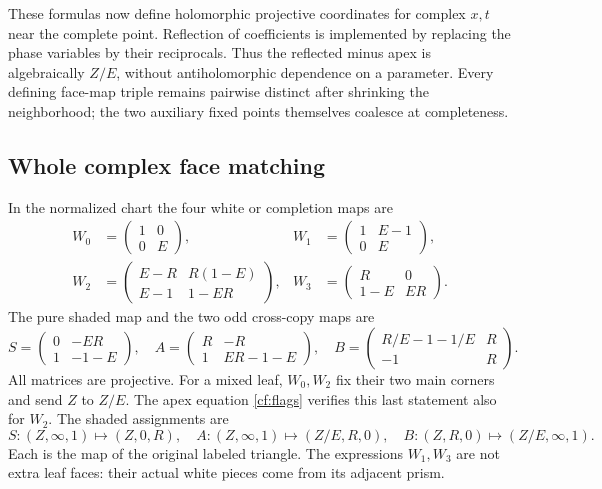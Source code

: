 These formulas now define holomorphic projective coordinates
for complex $x,t$ near the complete point.
Reflection of coefficients is implemented by replacing the
phase variables by their reciprocals. Thus the reflected
minus apex is algebraically $Z/E$, without antiholomorphic
dependence on a parameter. Every defining face-map triple remains
pairwise distinct after shrinking the neighborhood; the two
auxiliary fixed points themselves coalesce at completeness.

\subsection{Whole complex face matching}
In the normalized chart the four white or completion maps are
\begin{equation}\label{cf:white}
\begin{aligned}
 W_0&=\begin{pmatrix}1&0\\0&E\end{pmatrix},&
 W_1&=\begin{pmatrix}1&E-1\\0&E\end{pmatrix},\\
 W_2&=\begin{pmatrix}E-R&R(1-E)\\E-1&1-ER\end{pmatrix},&
 W_3&=\begin{pmatrix}R&0\\1-E&ER\end{pmatrix}.
\end{aligned}
\end{equation}
The pure shaded map and the two odd cross-copy maps are
\begin{equation}\label{cf:shaded}
 S=\begin{pmatrix}0&-ER\\1&-1-E\end{pmatrix},\quad
 A=\begin{pmatrix}R&-R\\1&ER-1-E\end{pmatrix},\quad
 B=\begin{pmatrix}R/E-1-1/E&R\\-1&R\end{pmatrix}.
\end{equation}
All matrices are projective. For a mixed leaf, $W_0,W_2$
fix their two main corners and send $Z$ to $Z/E$.
The apex equation \eqref{cf:flags} verifies this last statement
also for $W_2$. The shaded assignments are
\[
 S:(Z,\infty,1)\mapsto(Z,0,R),\quad
 A:(Z,\infty,1)\mapsto(Z/E,R,0),\quad
 B:(Z,R,0)\mapsto(Z/E,\infty,1).
\]
Each is the map of the original labeled triangle.
The expressions $W_1,W_3$ are not extra leaf faces:
their actual white pieces come from its adjacent prism.

